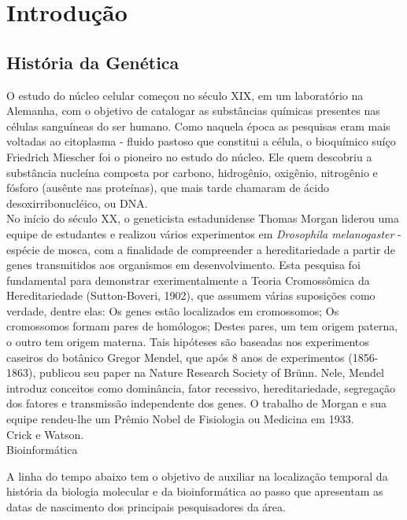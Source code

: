 \chapter{Introdução}

\section{História da Genética}

\indent O estudo do núcleo celular começou no século XIX, em um laboratório na Alemanha, com o objetivo de catalogar as substâncias químicas presentes nas células sanguíneas do ser humano. Como naquela época as pesquisas eram mais voltadas ao citoplasma - fluido pastoso que constitui a célula, o bioquímico suíço Friedrich Miescher foi o pioneiro no estudo do núcleo. Ele quem descobriu a substância nucleína composta por carbono, hidrogênio, oxigênio, nitrogênio e fósforo (ausênte nas proteínas), que mais tarde chamaram de ácido desoxirribonucléico, ou DNA. \\

\indent No início do século XX, o geneticista estadunidense Thomas Morgan liderou uma equipe de estudantes e realizou vários experimentos em \textit{Drosophila melanogaster} - espécie de mosca, com a finalidade de compreender a hereditariedade a partir de genes transmitidos aos organismos em desenvolvimento. Esta pesquisa foi fundamental para demonstrar exerimentalmente a Teoria Cromossômica da Hereditariedade (Sutton-Boveri, 1902), que assumem várias suposições como verdade, dentre elas: Os genes estão localizados em cromossomos; Os cromossomos formam pares de homólogos; Destes pares, um tem origem paterna, o outro tem origem materna. Tais hipóteses são baseadas nos experimentos caseiros do botânico Gregor Mendel, que após 8 anos de experimentos (1856-1863), publicou seu paper na Nature Research Society of Brünn. Nele, Mendel introduz conceitos como dominância, fator recessivo, hereditariedade, segregação dos fatores e transmissão independente dos genes. O trabalho de Morgan e sua equipe rendeu-lhe um Prêmio Nobel de Fisiologia ou Medicina em 1933. \\


Crick e Watson. \\

Bioinformática

\indent A linha do tempo abaixo tem o objetivo de auxiliar na localização temporal da história da biologia molecular e da bioinformática ao passo que apresentam as datas de nascimento dos principais pesquisadores da área.

